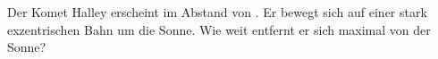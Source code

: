 Der Komet Halley erscheint im Abstand von \THaO. Er bewegt sich auf einer stark exzentrischen Bahn um die Sonne. Wie weit entfernt er sich maximal von der Sonne?
